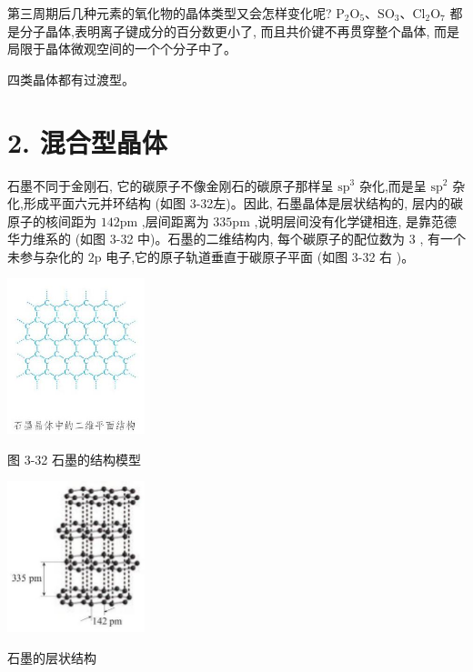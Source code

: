 \documentclass[10pt]{article}
\begin{document}
第三周期后几种元素的氧化物的晶体类型又会怎样变化呢? \({\mathrm{P}}_{2}{\mathrm{O}}_{5}\text{、}{\mathrm{{SO}}}_{3}\text{、}{\mathrm{{Cl}}}_{2}{\mathrm{O}}_{7}\) 都是分子晶体,表明离子键成分的百分数更小了, 而且共价键不再贯穿整个晶体, 而是局限于晶体微观空间的一个个分子中了。

四类晶体都有过渡型。

\section*{2. 混合型晶体}

石墨不同于金刚石, 它的碳原子不像金刚石的碳原子那样呈 \({\mathrm{{sp}}}^{3}\) 杂化,而是呈 \({\mathrm{{sp}}}^{2}\) 杂化,形成平面六元并环结构 (如图 3-32左)。因此, 石墨晶体是层状结构的, 层内的碳原子的核间距为 \({142}\mathrm{{pm}}\) ,层间距离为 \({335}\mathrm{{pm}}\) ,说明层间没有化学键相连, 是靠范德华力维系的 (如图 3-32 中)。石墨的二维结构内, 每个碳原子的配位数为 3 , 有一个未参与杂化的 \(2\mathrm{p}\) 电子,它的原子轨道垂直于碳原子平面 (如图 3-32 右 )。

\begin{center}
\includegraphics[max width=0.3\textwidth]{images/0190e026-5a11-7df7-bd27-54d09026ba7a_93_690697.jpg}
\end{center}

图 3-32 石墨的结构模型

\begin{center}
\includegraphics[max width=0.3\textwidth]{images/0190e026-5a11-7df7-bd27-54d09026ba7a_93_601681.jpg}
\end{center}

石墨的层状结构
\end{document}
